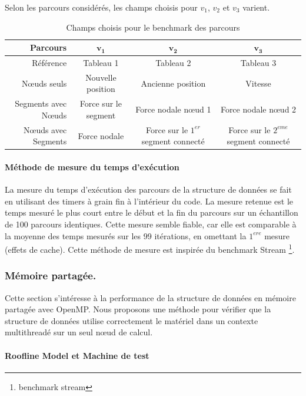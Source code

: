 Selon les parcours considérés, les champs choisis pour $v_1$, $v_2$ et $v_3$ varient. 

\begin{table}
	\begin{tabulary}{1.0\textwidth}{r||c|C|C}
		\textbf{Parcours} & $\bm{v_1}$ & $\bm{v_2}$ & $\bm{v_3}$\\
		\hline
		\hline
		Référence & Tableau 1 & Tableau 2 & Tableau 3 \\
		\hline
		Nœuds seuls & Nouvelle position & Ancienne position & Vitesse\\
		\hline
		Segments avec Nœuds & Force sur le segment & Force nodale nœud 1 & Force nodale nœud 2\\
		\hline
		Nœuds avec Segments & Force nodale & Force sur le $1^{er}$ segment connecté & Force sur le  $2^{eme}$ segment connecté\\
	\end{tabulary}
	\caption{ Champs choisis pour le benchmark des parcours }
\end{table}

\paragraph{Méthode de mesure du temps d'exécution}

La mesure du temps d'exécution des parcours de la structure de données se fait en utilisant des timers à grain fin à l'intérieur du code. La mesure retenue est le temps mesuré le plus court entre le début et la fin du parcours sur un échantillon de 100 parcours identiques. Cette mesure semble fiable, car elle est comparable à la moyenne des temps mesurés sur les 99 itérations, en omettant la $1^{ere}$ mesure (effets de cache). Cette méthode de mesure est inspirée du benchmark Stream \footnote{benchmark stream}.

\subsubsection{Mémoire partagée.}

Cette section s'intéresse à la performance de la structure de données en mémoire partagée avec OpenMP. Nous proposons une méthode pour vérifier que la structure de données utilise correctement le matériel dans un contexte multithreadé sur un seul nœud de calcul. 

\paragraph{Roofline Model et Machine de test}

